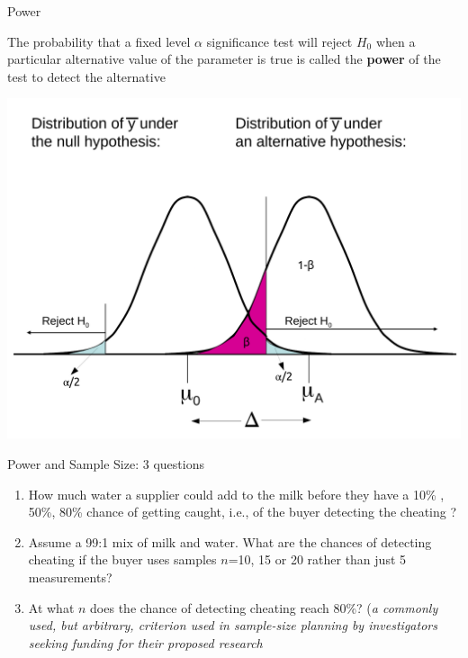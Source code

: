 \documentclass{beamer}\usepackage[]{graphicx}\usepackage[]{color}
\begin{document}
\begin{frame}[fragile]{Power}

\vspace*{-0.2in}

\begin{defm}[Power]
	The probability that a fixed level $\alpha$ significance test will reject $H_0$ when a particular alternative value of the parameter is true is called the \textbf{power} of the test to detect the alternative
\end{defm}


\vspace*{-0.08in}

\centering
\includegraphics[scale=0.31]{HypTest3-3.pdf}


\end{frame}




\begin{frame}{Power and Sample Size: 3 questions}

\begin{enumerate}
	\setlength\itemsep{1em}
	\item How much water a supplier could add to the milk before they have a 10\% , 50\%, 80\%
	chance of getting caught, i.e., of the buyer detecting the cheating ? \pause
	\item Assume a 99:1 mix of milk and water. What are the chances of detecting cheating if the buyer uses samples $n$=10, 15 or 20 rather than just 5 measurements? \pause
	\item At what $n$ does the chance of detecting cheating reach 80\%? (\textit{a commonly used, but arbitrary, criterion used in sample-size planning by investigators seeking funding for their proposed research}
	\end{enumerate}

\end{frame}
\end{document}
